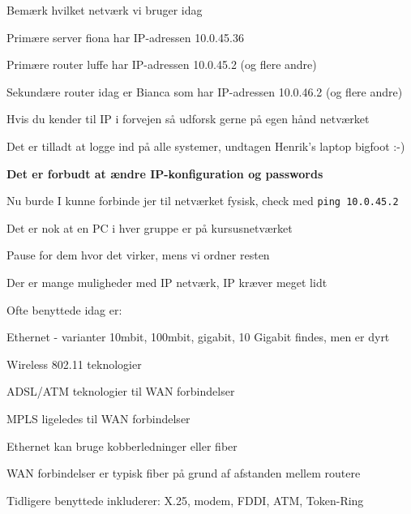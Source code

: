 \documentclass[Screen16to9,17pt]{foils}
\begin{document}

\begin{list1}
\item Bemærk hvilket netværk vi bruger idag
\item Primære server fiona har IP-adressen 10.0.45.36
\item Primære router luffe har IP-adressen 10.0.45.2 (og flere andre)
\item Sekundære router idag er Bianca som har IP-adressen 10.0.46.2 (og flere andre)
\item Hvis du kender til IP i forvejen så udforsk gerne på egen hånd netværket
\item Det er tilladt at logge ind på alle systemer, undtagen Henrik's laptop bigfoot :-)
\item {\bf Det er forbudt at ændre IP-konfiguration og passwords}
\item Nu burde I kunne forbinde jer til netværket fysisk, check med \verb+ping 10.0.45.2+
\item Det er nok at en PC i hver gruppe er på kursusnetværket
\end{list1}

\centerline{Pause for dem hvor det virker, mens vi ordner resten}






\begin{list1}
\item Der er mange muligheder med IP netværk, IP kræver meget lidt
\item Ofte benyttede idag er:
\begin{list2}
\item Ethernet - varianter 10mbit, 100mbit, gigabit, 10 Gigabit findes, men er dyrt
\item Wireless 802.11 teknologier
\item ADSL/ATM teknologier til WAN forbindelser
\item MPLS ligeledes til WAN forbindelser
\end{list2}
\item Ethernet kan bruge kobberledninger eller fiber
\item WAN forbindelser er typisk fiber på grund af afstanden mellem routere
\item Tidligere benyttede inkluderer: X.25, modem, FDDI, ATM, Token-Ring
\end{list1}
\end{document}
